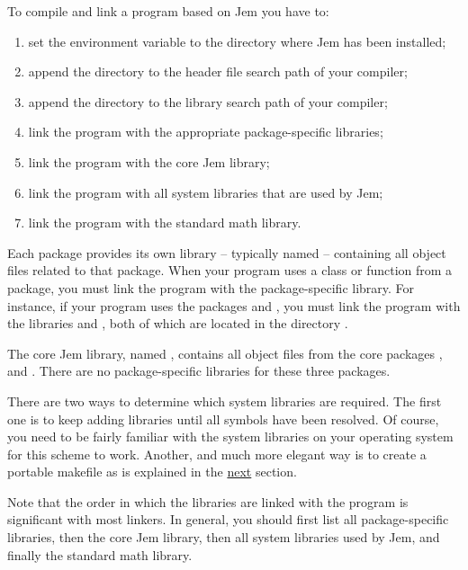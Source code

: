 \documentclass[a4paper,10pt]{article}
\begin{document}
To compile and link a program based on Jem you have to:
\begin{enumerate}

\item set the environment variable  to the directory where
  Jem has been installed;

\item append the directory  to the header file
  search path of your compiler;

\item append the directory  to the library search path
  of your compiler;

\item link the program with the appropriate package-specific libraries;

\item link the program with the core Jem library;

\item link the program with all system libraries that are used by Jem;

\item link the program with the standard math library.

\end{enumerate}

Each package provides its own library -- typically named
\- -- containing all object files related
to that package. When your program uses a class or function from a
package, you must link the program with the package-specific library. For
instance, if your program uses the packages  and
, you must link the program with the libraries
 and , both of which are located in the
directory .

The core Jem library, named , contains all object files from
the core packages ,  and . There are no
package-specific libraries for these three packages.

There are two ways to determine which system libraries are required. The
first one is to keep adding libraries until all symbols have been
resolved. Of course, you need to be fairly familiar with the system
libraries on your operating system for this scheme to work. Another, and
much more elegant way is to create a portable makefile as is explained in
the \hyperref[section:portable-makefiles]{next} section.

Note that the order in which the libraries are linked with the program
is significant with most linkers. In general, you should first list
all package-specific libraries, then the core Jem library, then all
system libraries used by Jem, and finally the standard math library.
\end{document}
